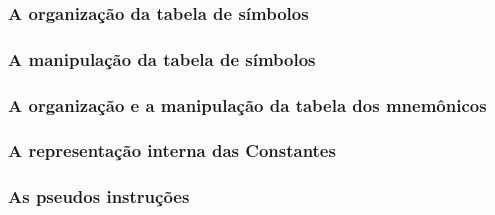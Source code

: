 \documentclass[a4paper,12pt]{article}
\begin{document}
\subsubsection{A organização da tabela de símbolos}
\subsubsection{A manipulação da tabela de símbolos}
\subsubsection{A organização e a manipulação da tabela dos mnemônicos}
\subsubsection{A representação interna das Constantes}
\subsubsection{As pseudos instruções}
\end{document}
